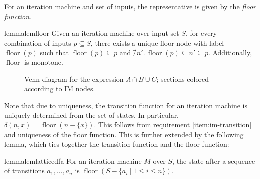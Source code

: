 \documentclass[acmsmall,screen,nonacm]{acmart}\settopmatter{printfolios=true,printccs=false,printacmref=false}
\DeclareMathOperator{\floor}{floor}
\newcommand*{\vennThreeFirst}{(90:0.875cm) circle (1.25cm)}
\newcommand*{\vennThreeSecond}{(210:0.875cm) circle (1.25cm)}
\newcommand*{\vennThreeThird}{(330:0.875cm) circle (1.25cm)}
\begin{document}
For an iteration machine and set of inputs,
the representative is given by the \emph{floor function}.

\begin{restatable}{lemma}{lemfloor}\label{lem:floor}
    Given an iteration machine over input set $S$, for every combination of inputs
    $p \subseteq S$, there exists a unique floor node with label $\floor(p)$
    such that $\floor(p) \subseteq p$ and $\nexists n'.\,
    \floor(p) \subseteq n' \subseteq p$. Additionally, $\floor$
    is monotone.
\end{restatable}

\begin{wrapfigure}{r}{0.2\textwidth}\centering
    \vspace{-2em}
    \caption{Venn diagram for the expression $A \cap B \cup C$;
    sections colored according to IM nodes.
    }\vspace{-3em}
    \label{fig:venn}
\end{wrapfigure}

Note that due to uniqueness,
the transition function for an iteration machine
is uniquely determined from the set of states.
In particular,
    $\delta(n, x) = \floor(n - \{x\})$.
This follows from requirement \ref{item:im-transition} and
uniqueness of the floor function.
This is further extended by the following lemma, which ties together
the transition function and the floor function:
\begin{restatable}{lemma}{lemlatticedfa}\label{lem:latticedfa}
    For an iteration machine $M$ over $S$, the state after
    a sequence of transitions $a_1, \dots, a_n$ is
    $\floor(S - \{ a_i \mid 1 \le i \le n \})$.
\end{restatable}
\end{document}
